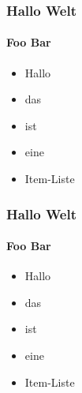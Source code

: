 \documentclass[12pt,ngerman]{beamer}
\begin{document}
\begin{frame}
\frametitle{Hallo Welt}
\framesubtitle{Foo Bar}

\begin{itemize}
\item<5->  Hallo
\item<3->  das
\item<2->  ist 
\item<4->  eine 
\item<1->  Item-Liste
\end{itemize}
\end{frame}


\begin{frame}
\frametitle{Hallo Welt}
\framesubtitle{Foo Bar}

\begin{itemize}[<+->]
\item  Hallo
\item  das
\item  ist 
\item  eine 
\item  Item-Liste
\end{itemize}
\end{frame}
\end{document}

